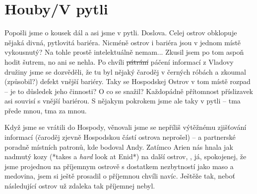 \documentclass[a4paper,twocolumn,openany,nodeprecatedcode, justified]{dndbook}
\begin{document}
	\section[Sezení 3]{Houby/V pytli}
	Popošli jsme o kousek dál a asi jsme v pytli. Doslova. Celej ostrov obklopuje nějaká divná, pytlovitá bariéra. Nicméně ostrov i bariéra jsou v jednom místě vykousnutý? Na tohle prostě intelektuálně nemam... Zkusil jsem po tom aspoň hodit šutrem, no ani se nehla. Po chvíli \sout{pátrání} páčení informací z Vladovy družiny jsme se dozvěděli, že tu byl nějaký čaroděj v černých róbách a zkoumal (způsobil?) defekt vnější bariéry. Taky se Hospodskej Ostrov v tom místě rozpad -- je to důsledek jeho činnosti? O co se snažil? Každopádně přítomnost příslizavek asi souvisí s vnější bariérou. S nějakym pokrokem jsme ale taky v pytli -- tma přede mnou, tma za mnou.
	
	Když jsme se vrátili do Hospody, věnovali jsme se nepříliš výtěžnému zjišťování informací (čaroděj zjevně Hospodskou částí ostrova neprošel) -- a partnerské poradně místních patronů, kde \emph{} bodoval Andy. Zatímco Arien nás hnala jak nadmutý kozy (*takes a \emph{hard} look at Enid*) na další ostrov, , já, spokojenej, že jsme projednou na příjemnym ostrově s dostatkem nezbytností jako maso a medovina, jsem si ještě prosadil o příjemnou chvíli navíc. Ještěže tak, neboť následující ostrov už zdaleka tak příjemnej nebyl.
	
\end{document}
